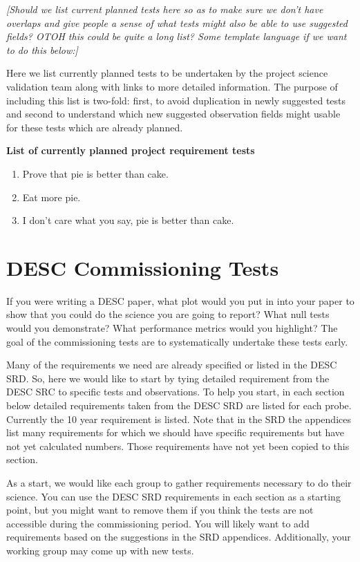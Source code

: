 \documentclass[modern]{desc-tex/styles/lsstdescnote}
\begin{document}
{\it [Should we list current planned tests here so as to make sure we don't have overlaps and give people a sense of what tests might also be able to use suggested fields?  OTOH this could be quite a long list?  Some template language if we want to do this below:] }

Here we list currently planned tests to be undertaken by the project science validation team along with links to more detailed information.  The purpose of including this list is two-fold: first, to avoid duplication in newly suggested tests and second to understand which new suggested observation fields might usable for these tests which are already planned.

\noindent
{\bf List of currently planned project requirement tests}
\begin{enumerate}
\item Prove that pie is better than cake.
\item Eat more pie.
\item I don't care what you say, pie is better than cake.
\end{enumerate}

\section{DESC Commissioning Tests}

If you were writing a DESC paper, what plot would you put in into your paper to show that you could do the science you are going to report? What null tests would you demonstrate?  What performance metrics would you highlight?  The goal of the commissioning tests are to systematically undertake these tests early.

Many of the requirements we need are already specified or listed in the DESC SRD.  So, here we would like to start by tying detailed requirement from the DESC SRC to specific tests and observations. To help you start, in each section below detailed requirements taken from the DESC SRD are listed for each probe.  Currently the 10 year requirement is listed.  Note that in the SRD the appendices list many requirements for which we should have specific requirements but have not yet calculated numbers. Those requirements have not yet been copied to this section.

As a start, we would like each group to gather requirements necessary to do their science.  You can use the DESC SRD requirements in each section as a starting point, but you might want to remove them if you think the tests are not accessible during the commissioning period. You will likely want to add requirements based on the suggestions in the SRD appendices.  Additionally, your working group may come up with new tests.
\end{document}
